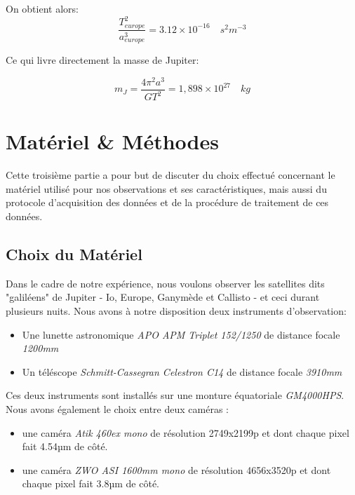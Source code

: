 \documentclass{aa}
\begin{document}
On obtient alors: 
\begin{equation}
    \frac{T_{europe}^2}{a_{europe}^3} = 3.12\times10^{-16} \quad s^2m^{-3}
\end{equation}

Ce qui livre directement la masse de Jupiter:

\begin{equation}
    m_J = \frac{4\pi^2a^3}{GT^2} = 1,898 \times 10^{27} \quad kg
\end{equation}

\section{Matériel \& Méthodes }

Cette troisième partie a pour but de discuter du choix effectué concernant le matériel utilisé pour nos observations et ses caractéristiques, mais aussi du protocole d'acquisition des données et de la procédure de traitement de ces données.    


\subsection{Choix du Matériel}
    Dans le cadre de notre expérience, nous voulons observer les satellites dits "galiléens" de Jupiter - Io, Europe, Ganymède et Callisto - et ceci durant plusieurs nuits. Nous avons à notre disposition deux instruments d'observation: 
    \begin{itemize}
        \item Une lunette astronomique \emph{APO APM Triplet 152/1250} de distance focale \emph{1200mm}

        \item Un téléscope \emph{Schmitt-Cassegran Celestron C14} de distance focale \emph{3910mm}
    \end{itemize}

Ces deux instruments sont installés sur une monture équatoriale \emph{GM4000HPS}. 
Nous avons également le choix entre deux caméras : 
\begin{itemize}
    \item une caméra \emph{Atik 460ex mono} de résolution 2749x2199p et dont chaque pixel fait 4.54µm de côté.
    \item une caméra \emph{ZWO ASI 1600mm mono} de résolution 4656x3520p et dont chaque pixel fait 3.8µm de côté.\\
\end{itemize}
\end{document}

